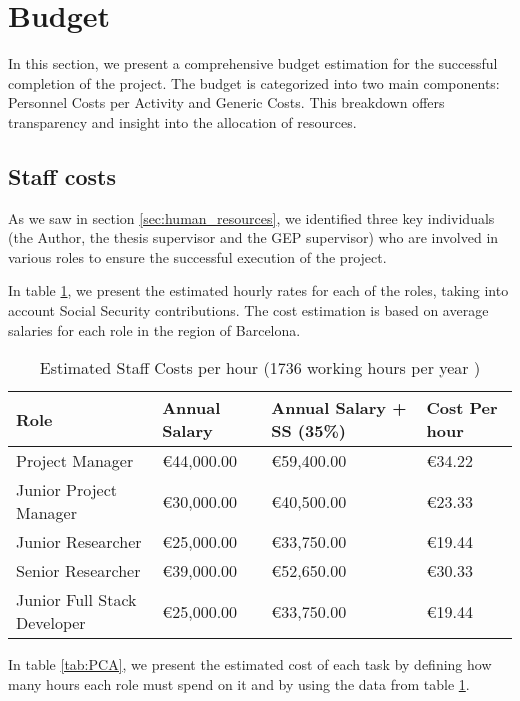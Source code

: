 \section{Budget} \label{sec:Budget}
In this section, we present a comprehensive budget estimation for the successful completion of the project. The budget is categorized into two main components: Personnel Costs per Activity and Generic Costs. This breakdown offers transparency and insight into the allocation of resources.
\subsection{Staff costs}

As we saw in section \ref{sec:human_resources}, we identified three key individuals (the Author, the thesis supervisor and the GEP supervisor) who are involved in various roles to ensure the successful execution of the project. 

In table \ref{tab:estimatedStaffCostsPerHour}, we present the estimated hourly rates for each of the roles, taking into account Social Security contributions. The cost estimation is based on average salaries for each role in the region of Barcelona. 

\begin{table}[H]
    \centering
    \begin{tabular}{l|l|l|l}
    \rowcolor{black!15}
        Role & Annual Salary & Annual Salary + SS (35\%) & Cost Per hour \\ \hline
        Project Manager & €44,000.00 \cite{glassPM} & €59,400.00 & €34.22 \\ \hline
        Junior Project Manager & €30,000.00 \cite{glassJPM} & €40,500.00 & €23.33 \\ \hline
        Junior Researcher & €25,000.00 \cite{glassJR} & €33,750.00 & €19.44 \\ \hline
        Senior Researcher & €39,000.00 \cite{glassSR}& €52,650.00 & €30.33 \\ \hline
        Junior Full Stack Developer & €25,000.00 \cite{glassJFSD} & €33,750.00 & €19.44 \\
    \end{tabular}
    \caption{Estimated Staff Costs per hour (1736 working hours per year \cite{statistaHours})}
    \label{tab:estimatedStaffCostsPerHour}
\end{table}

In table \ref{tab:PCA}, we present the estimated cost of each task by defining how many hours each role must spend on it and by using the data from table \ref{tab:estimatedStaffCostsPerHour}. 

